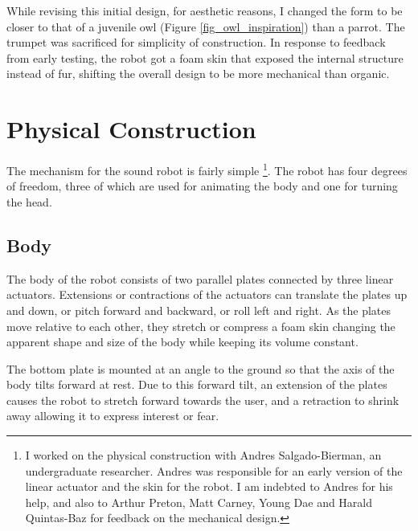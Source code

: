 While revising this initial design, for aesthetic reasons, I changed the form to be closer to that of a juvenile owl (Figure \ref{fig_owl_inspiration}) than a parrot. The trumpet was sacrificed for simplicity of construction. In response to feedback from early testing, the robot got a foam skin that exposed the internal structure instead of fur, shifting the overall design to be more mechanical than organic. 


\section{Physical Construction}

The mechanism for the sound robot is fairly simple \footnote{I worked on the physical construction with Andres Salgado-Bierman, an undergraduate researcher. Andres was responsible for an early version of the linear actuator and the skin for the robot. I am indebted to Andres for his help, and also to Arthur Preton, Matt Carney, Young Dae and Harald Quintas-Baz for feedback on the mechanical design.}. The robot has four degrees of freedom, three of which are used for animating the body and one for turning the head. 

\subsection{Body}

The body of the robot consists of two parallel plates connected by three linear actuators. Extensions or contractions of the actuators can translate the plates up and down, or pitch forward and backward, or roll left and right. As the plates move relative to each other, they stretch or compress a foam skin changing the apparent shape and size of the body while keeping its volume constant. 

The bottom plate is mounted at an angle to the ground so that the axis of the body tilts forward at rest. Due to this forward tilt, an extension of the plates causes the robot to stretch forward towards the user, and a retraction to shrink away allowing it to express interest or fear. 






